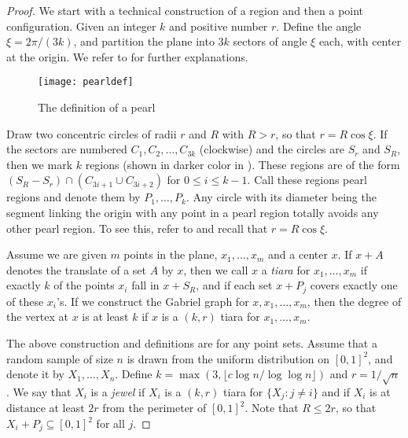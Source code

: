 \documentclass[lotsofwhite,charterfonts]{patmorin}
\begin{document}
\begin{proof}
We start with a technical construction of a region
and then a point configuration.
Given an integer $k$ and positive number $r$.
Define the angle $\xi = 2\pi / (3k)$,
and partition the plane into $3k$ sectors
of angle $\xi$ each, with center at the origin.
We refer to  for further explanations.

\begin{figure}[htbp]
\begin{center}\texttt{[image: pearldef]}\end{center}
\caption{The definition of a pearl}
\end{figure}

Draw two concentric circles of radii $r$ and $R$
with $R > r$, so that $r = R \cos \xi$.
If the sectors are numbered $C_1, C_2, \ldots, C_{3k}$
(clockwise)
and the circles are $S_r$ and $S_R$, then we
mark $k$ regions (shown in darker color in ). These regions are of the form
$(S_R - S_r) \cap (C_{3i+1} \cup C_{3i+2})$ for
$0 \le i \le k-1$. 
Call these regions pearl regions
and denote them by $P_1 , \ldots, P_k$.
Any circle with
its diameter being the segment linking the origin with
any point in a pearl region totally avoids any other
pearl region. To see this, refer to 
and recall that $r = R \cos \xi$.

Assume we are given $m$ points in the plane,
$x_1,\ldots,x_m$ and a center $x$.
If $x+A$ denotes the translate of a set $A$ by $x$,
then we call $x$ a {\it tiara} for $x_1 , \ldots , x_m$
if exactly $k$ of the points $x_i$ fall in $x+S_R$,
and if each set $x+P_j$ covers exactly one of
these $x_i$'s.
If we construct the Gabriel graph for $x,x_1,\ldots,x_m$,
then the degree of the vertex at $x$ is at least $k$
if $x$ is a $(k,r)$ tiara for $x_1,\ldots,x_m$.

The above construction and definitions are
for any point sets.
Assume that a random sample of size $n$ is drawn
from the uniform distribution on $[0,1]^2$,
and denote it by $X_1 , \ldots, X_n$.
Define $k = \max( 3, \lfloor c \log n / \log \log n \rfloor)$
and $r = 1/\sqrt{n}$.
We say that $X_i$ is a {\it jewel}
if $X_i$ is a $(k,r)$ tiara for $\{ X_j : j \not= i \}$
and if $X_i$ is at distance at least $2r$ from the
perimeter of $[0,1]^2$. Note that $R \le 2r$, so that
$X_i + P_j \subseteq [0,1]^2$ for all $j$.


\end{proof}
\end{document}

